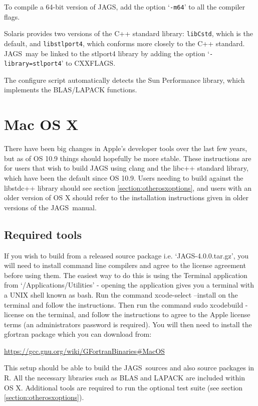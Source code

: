 \documentclass[11pt, a4paper, titlepage]{article}
\newcommand{\release}{4.0.0}
\newcommand{\JAGS}{\textsf{JAGS}}
\newcommand{\code}[1]{{\bgroup{\normalfont\ttfamily #1}\egroup}}
\newcommand{\samp}[1]{{`\bgroup\normalfont\texttt{#1}'\egroup}}
\newcommand{\file}[1]{{`\normalfont\textsf{#1}'}}
\let\option=\samp
\begin{document}
To compile a 64-bit version of JAGS, add the option \option{-m64} to
all the compiler flags.

Solaris provides two versions of the C++ standard library:
\texttt{libCstd}, which is the default, and \texttt{libstlport4},
which conforms more closely to the C++ standard. \JAGS\ may be linked
to the stlport4 library by adding the option
\option{-library=stlport4} to \code{CXXFLAGS}. 

The configure script automatically detects the Sun Performance library,
which implements the BLAS/LAPACK functions.  

\clearpage
\section{Mac OS X}

There have been big changes in Apple's developer tools over the last few
years, but as of OS 10.9 things should hopefully be more stable.  These
instructions are for users that wish to build JAGS using clang and the
libc++ standard library, which have been the default since OS 10.9.  Users
needing to build against the libstdc++ library should see section \ref{section:otherosxoptions}, 
and users with an older version of OS X should refer to the installation
instructions given in older versions of the \JAGS~manual.

\subsection{Required tools}

If you wish to build from a released source package i.e.
\file{JAGS-\release.tar.gz}, you will need to install command line compilers
and agree to the license agreement before using them. The easiest way 
to do this is using the Terminal application from \file{/Applications/Utilities} 
- opening the application gives you a terminal with a UNIX shell known as bash.  
Run the command \code{xcode-select --install} on the terminal and follow the
instructions.  Then run the command \code{sudo xcodebuild -license} 
on the terminal, and follow the instructions to agree to the Apple
license terms (an administrators password is required).  You will then
need to install the gfortran package which you can download from:

\url{https://gcc.gnu.org/wiki/GFortranBinaries#MacOS}

This setup should be able to build the \JAGS\ sources and also source
packages in R.  All the necessary libraries such as BLAS and LAPACK are
included within OS X.  Additional tools are required to run the optional 
test suite (see section \ref{section:otherosxoptions}).
\end{document}
